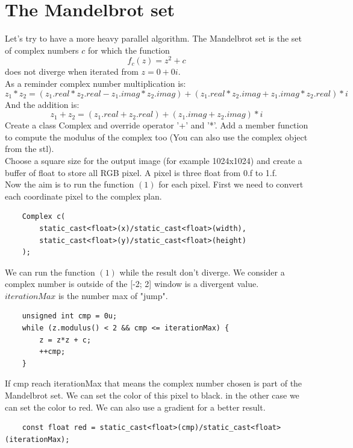 \documentclass{article}
\begin{document}
\section{The Mandelbrot set}
Let's try to have a more heavy parallel algorithm. The Mandelbrot set is the set of complex numbers $c$ for which the function
\begin{equation}
f_c(z) = z^2+c
\end{equation}
does not diverge when iterated from $z = 0+0i$.\\
As a reminder complex number multiplication is:
\begin{equation}
z_1*z_2 = (z_1.real*z_2.real-z_1.imag*z_2.imag) + (z_1.real*z_2.imag + z_1.imag*z_2.real)*i
\end{equation}
And the addition is:
\begin{equation}
z_1 + z_2 = (z_1.real + z_2.real) + (z_1.imag + z_2.imag)*i
\end{equation}
Create a class Complex and override operator '+' and '*'. Add a member function to compute the modulus of the complex too (You can also use the complex object from the stl).\\
Choose a square size for the output image (for example 1024x1024) and create a buffer of float to store all RGB pixel. A pixel is three float from 0.f to 1.f.\\
Now the aim is to run the function $(1)$ for each pixel. First we need to convert each coordinate pixel to the complex plan.
\begin{lstlisting}
	Complex c(
		static_cast<float>(x)/static_cast<float>(width),
		static_cast<float>(y)/static_cast<float>(height)
	);
\end{lstlisting}
We can run the function $(1)$ while the result don't diverge. We consider a complex number is outside of the [-2; 2] window is a divergent value. $iterationMax$ is the number max of "jump".
\begin{lstlisting}
	unsigned int cmp = 0u;
	while (z.modulus() < 2 && cmp <= iterationMax) {
		z = z*z + c;
		++cmp;
	}
\end{lstlisting}
If cmp reach iterationMax that means the complex number chosen is part of the Mandelbrot set. We can set the color of this pixel to black. in the other case we can set the color to red. We can also use a gradient for a better result.
\begin{lstlisting}
	const float red = static_cast<float>(cmp)/static_cast<float>(iterationMax);
\end{lstlisting}
\end{document}
